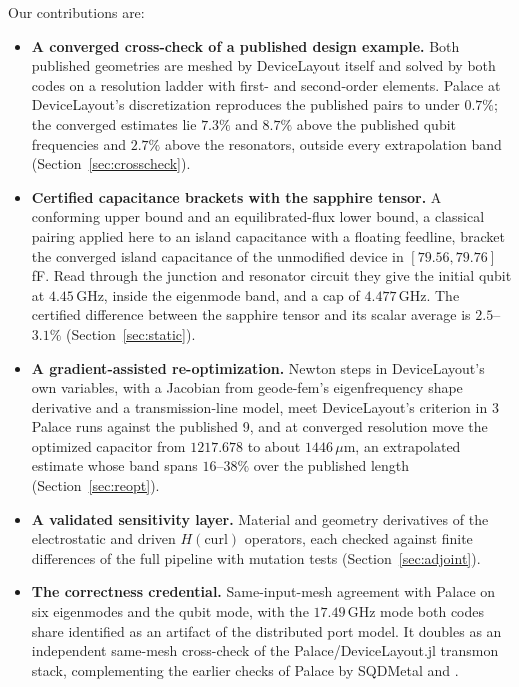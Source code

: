 \documentclass{anvil-paper}
\begin{document}
Our contributions are:
\begin{itemize}
  \item \textbf{A converged cross-check of a published design example.}
    Both published geometries are meshed by DeviceLayout itself and solved
    by both codes on a resolution ladder with first- and second-order
    elements. Palace at DeviceLayout's discretization reproduces the
    published pairs to under $0.7\%$; the converged estimates lie
    $7.3\%$ and $8.7\%$ above the published qubit frequencies and $2.7\%$
    above the resonators, outside every extrapolation band
    (Section~\ref{sec:crosscheck}).
  \item \textbf{Certified capacitance brackets with the sapphire tensor.}
    A conforming upper bound and an equilibrated-flux lower bound, a
    classical pairing applied here to an island capacitance with a
    floating feedline, bracket the converged island capacitance of the
    unmodified device in $[79.56, 79.76]$\,fF. Read through the junction
    and resonator circuit they give the initial qubit at $4.45$\,GHz,
    inside the eigenmode band, and a cap of $4.477$\,GHz. The certified
    difference between the sapphire tensor and its scalar average is
    $2.5$--$3.1\%$ (Section~\ref{sec:static}).
  \item \textbf{A gradient-assisted re-optimization.} Newton steps in
    DeviceLayout's own variables, with a Jacobian from geode-fem's
    eigenfrequency shape derivative and a transmission-line model,
    meet DeviceLayout's criterion in 3 Palace runs against the published
    9, and at converged resolution move the optimized capacitor from
    $1217.678$ to about $1446\,\mu$m, an extrapolated estimate whose band
    spans $16$--$38\%$ over the published length
    (Section~\ref{sec:reopt}).
  \item \textbf{A validated sensitivity layer.} Material and geometry
    derivatives of the electrostatic and driven $H(\mathrm{curl})$
    operators, each checked against finite differences of the full
    pipeline with mutation tests (Section~\ref{sec:adjoint}).
  \item \textbf{The correctness credential.} Same-input-mesh agreement
    with Palace on six eigenmodes and the qubit mode, with the
    $17.49$\,GHz mode both codes share identified as an artifact of the
    distributed port model. It doubles as an independent same-mesh
    cross-check of the Palace/DeviceLayout.jl transmon stack, complementing
    the earlier checks of Palace by SQDMetal \citep{sommers2025open} and
    \citet{ye2025electromagnetic}.
\end{itemize}
\end{document}
